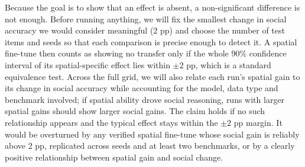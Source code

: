 Because the goal is to show that an effect is absent, a non-significant difference is not enough. Before running anything, we will fix the smallest change in social accuracy we would consider meaningful (2 pp) and choose the number of test items and seeds so that each comparison is precise enough to detect it. A spatial fine-tune then counts as showing no transfer only if the whole 90\% confidence interval of its spatial-specific effect lies within $\pm 2$ pp, which is a standard equivalence test. Across the full grid, we will also relate each run's spatial gain to its change in social accuracy while accounting for the model, data type and benchmark involved; if spatial ability drove social reasoning, runs with larger spatial gains should show larger social gains. The claim holds if no such relationship appears and the typical effect stays within the $\pm 2$ pp margin. It would be overturned by any verified spatial fine-tune whose social gain is reliably above 2 pp, replicated across seeds and at least two benchmarks, or by a clearly positive relationship between spatial gain and social change.
